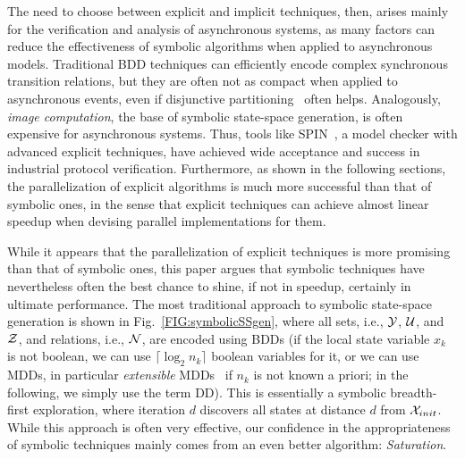 \documentclass[copyright,creativecommons]{eptcs}
\begin{document}
The need to choose between explicit and implicit techniques, then, arises
mainly for the
verification and analysis of asynchronous systems, as many factors can reduce
the effectiveness of symbolic algorithms when applied to asynchronous models.
Traditional BDD techniques can efficiently encode complex synchronous transition
relations, but they are often not as compact when applied to asynchronous
events, even if disjunctive partitioning~\cite{Burch1991partitioned}
often helps.
Analogously, \emph{image computation}, the base of symbolic state-space
generation, is often expensive for asynchronous systems.
Thus, tools like SPIN~\cite{Holzmann2003spin}, a model checker
with advanced explicit techniques, have achieved wide acceptance and
success in industrial protocol verification.
Furthermore, as shown in the following sections, the parallelization
of explicit algorithms is much more successful than that of symbolic
ones, in the sense that explicit techniques can achieve almost linear
speedup when devising parallel implementations for them.

While it appears that the parallelization of explicit techniques is
more promising than that of symbolic ones, this paper argues that
symbolic techniques have nevertheless often the best chance to
shine, if not in speedup, certainly in ultimate performance.
The most traditional approach to symbolic state-space generation is
shown in Fig.~\ref{FIG:symbolicSSgen}, where all sets, i.e.,
$\mathcal{Y}$, $\mathcal{U}$, and $\mathcal{Z}$, and relations, i.e., $\mathcal{N}$, are
encoded using BDDs (if the local state variable $x_k$ is not
boolean, we can use $\lceil \log_2 n_k \rceil$ boolean variables for
it, or we can use MDDs, in particular \emph{extensible}
MDDs~\cite{2009SOFSEM-extensible} if $n_k$ is not known a priori; in
the following, we simply use the term DD).
This is essentially a
symbolic breadth-first exploration, where iteration $d$ discovers
all states at distance $d$ from $\mathcal{X}_{init}$. While this approach
is often very effective, our confidence in the appropriateness of
symbolic techniques mainly comes from an even better algorithm:
\emph{Saturation}.
\end{document}
